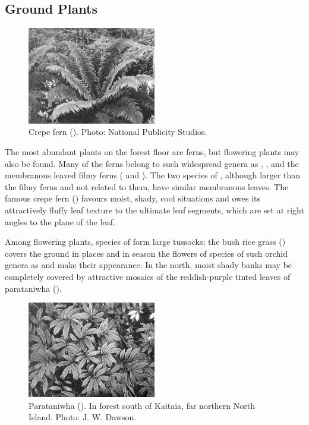 \subsection{Ground Plants}

\begin{figure}
	\includegraphics[width=0.5\textwidth]{graphics/figure62crepefern.jpg}
	\centering
	\caption[Crepe fern (\emph{Leptopteris superb a})]{Crepe fern ().
	Photo: National Publicity Studios.}%
	\label{fig:62crepefern}
\end{figure}

The most abundant plants on the forest floor are ferns, but flowering plants may also be found.
Many of the ferns belong to such widespread genera as , ,  and the membranous leaved filmy ferns ( and ).
The two species of , although larger than the filmy ferns and not related to them, have similar membranous leaves.
The famous crepe fern () favours moist, shady, cool situations and owes its attractively fluffy leaf texture to the ultimate leaf segments, which are set at right angles to the plane of the leaf.

Among flowering plants, species of  form large tussocks; the bush rice grass () covers the ground in places and in season the flowers of species of such orchid genera as  and  make their appearance.
In the north, moist shady banks may be completely covered by attractive mosaics of the reddish-purple tinted leaves of parataniwha ().

\begin{figure}
	\includegraphics[width=0.5\textwidth]{graphics/figure63parataniwha.jpg}
	\centering
	\caption[Parataniwha]{Parataniwha ().
In forest south of Kaitaia, far northern North Island.
	Photo: J. W. Dawson.}%
	\label{fig:63parataniwha}
\end{figure}

